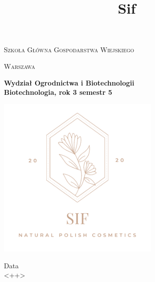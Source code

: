\documentclass{article}
\title{Sif}
\begin{document}
\begin{titlepage}
	\begin{center}
	{\scshape\huge Szkoła Główna Gospodarstwa Wiejskiego \par}
	\vspace{0.5cm}
	{\scshape\LARGE Warszawa \par}
	\vspace{0.5cm}
	{\LARGE\bfseries Wydział Ogrodnictwa i Biotechnologii \\ Biotechnologia, rok 3 semestr 5 \par}
	{\includegraphics[width=0.6\textwidth]{sif.png}}
	\vfill

\vfill

	{\LARGE Data \\ <++> \par}
	\end{center}
\end{titlepage}

\tableofcontents

\newpage





\nocite{Grote1988, Oh1987, Leite2020, Ziaja, 4Szpaki, Kosmopedia, KosmetykWszechCzasów, SubiektynikKosmetyczny, Loczek}














\end{document}
